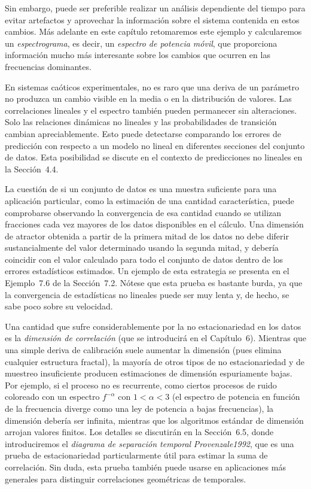 \documentclass[10pt,a4paper]{book}
\begin{document}
Sin embargo, puede ser preferible realizar un análisis dependiente del tiempo para evitar artefactos y aprovechar la información sobre el sistema contenida en estos cambios. Más adelante en este capítulo retomaremos este ejemplo y calcularemos un \emph{espectrograma}, es decir, un \emph{espectro de potencia móvil}, que proporciona información mucho más interesante sobre los cambios que ocurren en las frecuencias dominantes.

En sistemas caóticos experimentales, no es raro que una deriva de un parámetro no produzca un cambio visible en la media o en la distribución de valores. Las correlaciones lineales y el espectro también pueden permanecer sin alteraciones. Solo las relaciones dinámicas no lineales y las probabilidades de transición cambian apreciablemente. Esto puede detectarse comparando los errores de predicción con respecto a un modelo no lineal en diferentes secciones del conjunto de datos. Esta posibilidad se discute en el contexto de predicciones no lineales en la Sección~4.4.

La cuestión de si un conjunto de datos es una muestra suficiente para una aplicación particular, como la estimación de una cantidad característica, puede comprobarse observando la convergencia de esa cantidad cuando se utilizan fracciones cada vez mayores de los datos disponibles en el cálculo. Una dimensión de atractor obtenida a partir de la primera mitad de los datos no debe diferir sustancialmente del valor determinado usando la segunda mitad, y debería coincidir con el valor calculado para todo el conjunto de datos dentro de los errores estadísticos estimados. Un ejemplo de esta estrategia se presenta en el Ejemplo~7.6 de la Sección~7.2. Nótese que esta prueba es bastante burda, ya que la convergencia de estadísticas no lineales puede ser muy lenta y, de hecho, se sabe poco sobre su velocidad.

Una cantidad que sufre considerablemente por la no estacionariedad en los datos es la \emph{dimensión de correlación} (que se introducirá en el Capítulo~6). Mientras que una simple deriva de calibración suele aumentar la dimensión (pues elimina cualquier estructura fractal), la mayoría de otros tipos de no estacionariedad y de muestreo insuficiente producen estimaciones de dimensión espuriamente bajas. Por ejemplo, si el proceso no es recurrente, como ciertos procesos de ruido coloreado con un espectro $f^{-\alpha}$ con $1 < \alpha < 3$ (el espectro de potencia en función de la frecuencia diverge como una ley de potencia a bajas frecuencias), la dimensión debería ser infinita, mientras que los algoritmos estándar de dimensión arrojan valores finitos. Los detalles se discutirán en la Sección~6.5, donde introduciremos el \emph{diagrama de separación temporal} \textit{Provenzale1992}, que es una prueba de estacionariedad particularmente útil para estimar la suma de correlación. Sin duda, esta prueba también puede usarse en aplicaciones más generales para distinguir correlaciones geométricas de temporales.
\end{document}
